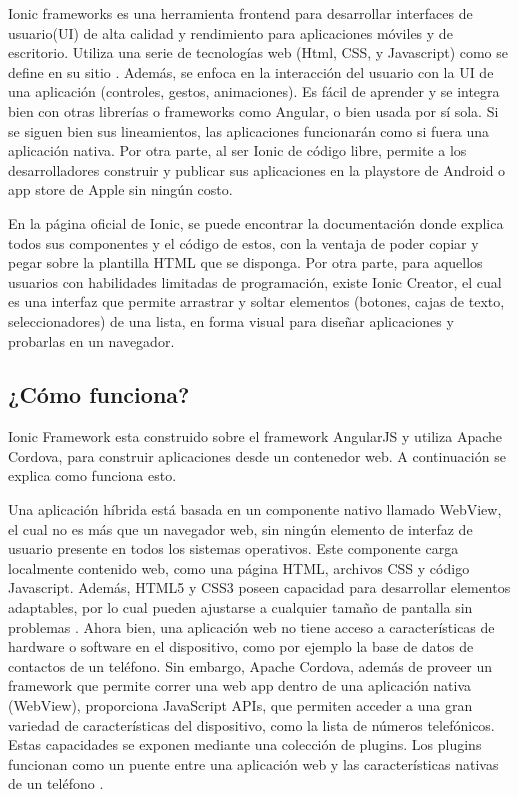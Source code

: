 Ionic frameworks es una herramienta frontend para desarrollar interfaces de usuario(UI) de alta calidad y rendimiento para aplicaciones móviles y de escritorio. Utiliza una serie de tecnologías web (Html, CSS, y Javascript) como se define en su sitio \citep{ionicFramework}. Además, se enfoca en la interacción del usuario con la  UI de una aplicación (controles, gestos, animaciones). Es fácil de aprender y se integra bien con otras librerías o frameworks como Angular, o bien usada por sí sola. Si se siguen bien sus lineamientos, las aplicaciones funcionarán como si fuera una aplicación nativa. Por otra parte, al ser Ionic de código libre, permite a los desarrolladores construir y publicar sus aplicaciones en la playstore de Android o app store de Apple sin ningún costo.

En la página oficial de Ionic, se puede encontrar la documentación donde explica todos sus componentes y el código de estos, con la ventaja de poder copiar y pegar sobre la plantilla HTML que se disponga. Por otra parte, para aquellos usuarios con habilidades limitadas de programación, existe Ionic Creator, el cual es una interfaz que permite arrastrar y soltar elementos (botones, cajas de texto, seleccionadores) de una lista, en forma visual para diseñar aplicaciones y probarlas en un navegador. 

\subsection{¿Cómo funciona?}
Ionic Framework esta construido sobre el  framework AngularJS y utiliza Apache Cordova, para construir aplicaciones desde un contenedor web. A continuación se explica como funciona esto.

Una aplicación híbrida está basada en un componente nativo llamado WebView, el cual no es más que un navegador web, sin ningún elemento de interfaz de usuario presente en todos los sistemas operativos. Este componente carga localmente contenido web, como una página HTML, archivos CSS y código Javascript. Además, HTML5 y CSS3 poseen capacidad para desarrollar  elementos adaptables, por lo cual pueden ajustarse a cualquier tamaño de pantalla sin problemas \citep*{Khanna:2017:IHM:3161211}. Ahora bien, una aplicación web no tiene acceso a características de hardware o software en el dispositivo, como por ejemplo la base de datos de contactos de un teléfono. Sin embargo, Apache Cordova, además de proveer un framework que permite  correr una web app dentro de una aplicación nativa (WebView), proporciona JavaScript APIs, que permiten acceder a una gran variedad de características del dispositivo, como la lista de números telefónicos. Estas capacidades se exponen mediante una colección de plugins. Los plugins funcionan como un puente entre una aplicación web y las características nativas de un teléfono \citep{cordova}.

